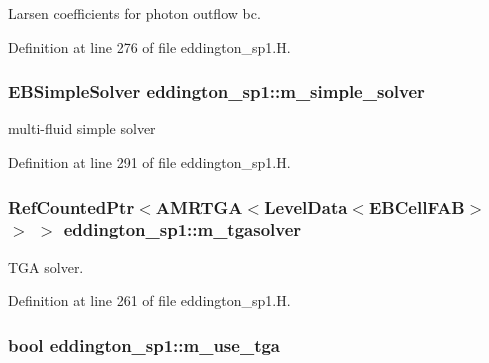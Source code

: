 Larsen coefficients for photon outflow bc. 



Definition at line 276 of file eddington\+\_\+sp1.\+H.

\subsubsection[{\texorpdfstring{m\+\_\+simple\+\_\+solver}{m_simple_solver}}]{\setlength{\rightskip}{0pt plus 5cm}E\+B\+Simple\+Solver eddington\+\_\+sp1\+::m\+\_\+simple\+\_\+solver\hspace{0.3cm}{\ttfamily [protected]}}\hypertarget{classeddington__sp1_ae96063dbad675db6e801b1f60b7daa6f}{}\label{classeddington__sp1_ae96063dbad675db6e801b1f60b7daa6f}


multi-\/fluid simple solver 



Definition at line 291 of file eddington\+\_\+sp1.\+H.

\subsubsection[{\texorpdfstring{m\+\_\+tgasolver}{m_tgasolver}}]{\setlength{\rightskip}{0pt plus 5cm}Ref\+Counted\+Ptr$<$A\+M\+R\+T\+GA$<$Level\+Data$<$E\+B\+Cell\+F\+AB$>$ $>$ $>$ eddington\+\_\+sp1\+::m\+\_\+tgasolver\hspace{0.3cm}{\ttfamily [protected]}}\hypertarget{classeddington__sp1_a1c35e2488bfc64c9e1d6abfe722651be}{}\label{classeddington__sp1_a1c35e2488bfc64c9e1d6abfe722651be}


T\+GA solver. 



Definition at line 261 of file eddington\+\_\+sp1.\+H.

\subsubsection[{\texorpdfstring{m\+\_\+use\+\_\+tga}{m_use_tga}}]{\setlength{\rightskip}{0pt plus 5cm}bool eddington\+\_\+sp1\+::m\+\_\+use\+\_\+tga\hspace{0.3cm}{\ttfamily [protected]}}\hypertarget{classeddington__sp1_ad2882829d0356f7a1d5afb1823b3d744}{}\label{classeddington__sp1_ad2882829d0356f7a1d5afb1823b3d744}


